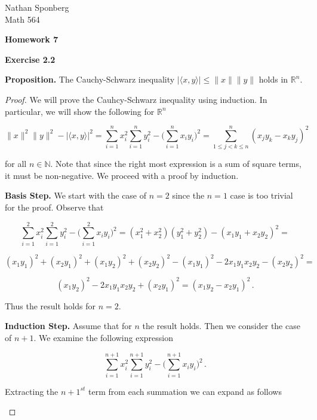 \documentclass[a4paper]{article}
\numberwithin{equation}{section}
\begin{document}
\begin{flushright}
{\small{Nathan Sponberg\\}}
{\small{Math 564}}
\end{flushright}

\begin{center}
\bf{Homework 7}
\end{center}

\begin{description}

\item \textbf{Exercise 2.2}

\item \textbf{Proposition.} The Cauchy-Schwarz inequality $|\langle x,y \rangle| \leq \|x\|\|y\|$ holds in $\mathbb{R}^n$.

\begin{proof} We will prove the Cauhcy-Schwarz inequality using induction. In particular, we will show the following for $\mathbb{R}^n$

$$\|x\|^2\|y\|^2-|\langle x,y \rangle|^2 = \sum_{i=1}^n x_i^2\sum_{i=1}^ny_i^2 -   \Big(\sum_{i=1}^nx_iy_i\Big)^2 = \sum_{1 \leq j < k \le n}^n (x_jy_k - x_ky_j)^2$$

for all $n \in \mathbb{N}$. Note that since the right most expression is a sum of square terms, it must be non-negative. We proceed with a proof by induction.

\begin{description}
\item \textbf{Basis Step.} We start with the case of $n = 2$ since the $n=1$ case is too trivial for the proof. Observe that

$$\sum_{i=1}^2 x_i^2\sum_{i=1}^2y_i^2 -   \Big(\sum_{i=1}^2x_iy_i\Big)^2 = (x_1^2+x_2^2)(y_1^2+y_2^2) - (x_1y_1+ x_2y_2)^2 = $$

$$(x_1y_1)^2+(x_2y_1)^2+(x_1y_2)^2+(x_2y_2)^2 - (x_1y_1)^2 - 2x_1y_1x_2y_2 - (x_2y_2)^2 = $$

$$(x_1y_2)^2 - 2x_1y_1x_2y_2 + (x_2y_1)^2 = (x_1y_2 - x_2y_1)^2\,.$$

Thus the result holds for $n = 2$.

\item \textbf{Induction Step.} Assume that for $n$ the result holds. Then we consider the case of $n+1$. We examine the following expression

$$\sum_{i=1}^{n+1} x_i^2\sum_{i=1}^{n+1}y_i^2 -   \Big(\sum_{i=1}^{n+1}x_iy_i\Big)^2\,.$$

Extracting the $n+1^{st}$ term from each summation we can expand as follows


\end{description}
\end{proof}
\end{description}
\end{document}
